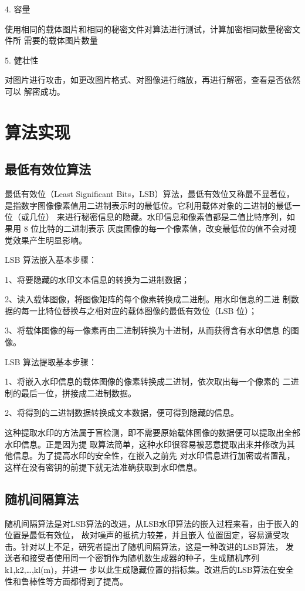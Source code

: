 \documentclass[a4paper,zihao=5,UTF8]{ctexart}
\begin{document}
4. 容量

使用相同的载体图片和相同的秘密文件对算法进行测试，计算加密相同数量秘密文件所
需要的载体图片数量

5. 健壮性

对图片进行攻击，如更改图片格式、对图像进行缩放，再进行解密，查看是否依然可以
解密成功。

\section{算法实现}

\subsection{最低有效位算法}

    最低有效位（Least Significant Bits，LSB）算法，最低有效位又称最不显著位，
是指数字图像像素值用二进制表示时的最低位。它利用载体对象的二进制的最低一位（或几位）
来进行秘密信息的隐藏。水印信息和像素值都是二值比特序列，如果用 8 位比特的二进制表示
灰度图像的每一个像素值，改变最低位的值不会对视觉效果产生明显影响。

LSB 算法嵌入基本步骤：

    1、将要隐藏的水印文本信息的转换为二进制数据；

    2、读入载体图像，将图像矩阵的每个像素转换成二进制。用水印信息的二进
制数据的每一比特位替换与之相对应的载体图像的最低有效位（LSB 位）；

    3、将载体图像的每一像素再由二进制转换为十进制，从而获得含有水印信息
的图像。

LSB 算法提取基本步骤：

    1、将嵌入水印信息的载体图像的像素转换成二进制，依次取出每一个像素的
二进制的最后一位，拼接成二进制数据。

    2、将得到的二进制数据转换成文本数据，便可得到隐藏的信息。

    这种提取水印的方法属于盲检测，即不需要原始载体图像的数据便可以提取出全部水印信息。正是因为提
取算法简单，这种水印很容易被恶意提取出来并修改为其他信息。为了提高水印的安全性，在嵌入之前先
对水印信息进行加密或者置乱，这样在没有密钥的前提下就无法准确获取到水印信息。

\subsection{随机间隔算法}

随机间隔算法是对LSB算法的改进，从LSB水印算法的嵌入过程来看，由于嵌入的位置是最低有效位，
故对噪声的抵抗力较差，并且嵌入
位置固定，容易遭受攻击。针对以上不足，研究者提出了随机间隔算法，这是一种改进的LSB算法，
发送者和接受者使用同一个密钥作为随机数生成器的种子，生成随机序列 k1,k2,…,kl(m)，并进一
步以此生成隐藏位置的指标集。改进后的LSB算法在安全性和鲁棒性等方面都得到了提高。
\end{document}
